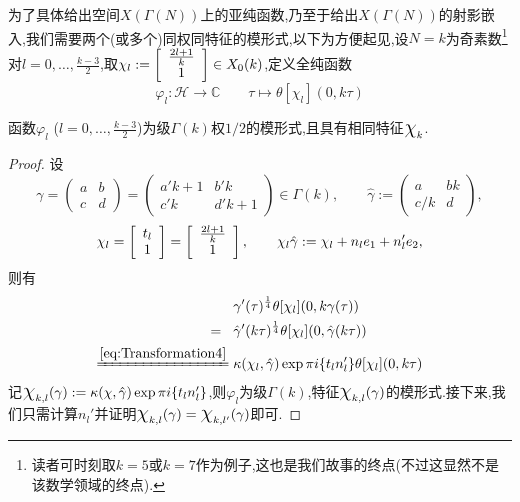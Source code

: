 为了具体给出空间$X(\Gamma(N))$上的亚纯函数,乃至于给出$X(\Gamma(N))$的射影嵌入,我们需要两个(或多个)同权同特征的模形式,以下为方便起见,设$N=k$为奇素数\footnote{读者可时刻取$k=5$或$k=7$作为例子,这也是我们故事的终点(不过这显然不是该数学领域的终点).}对$l=0,\ldots,\frac{k-3}{2}$,取$\chi_l:= \left[\begin{array}{c}{\frac{2l+1}{k}} \\ {1}\end{array}\right] \in X_0(k)$,定义全纯函数
$$\varphi_l: \mathcal{H} \longrightarrow \mathbb{C} \qquad \tau \longmapsto \theta[\chi_l](0,k\tau)$$
\begin{theorem}
	函数$\varphi_l$ ($l=0,\ldots,\frac{k-3}{2}$)为级$\Gamma(k)$权$1/2$的模形式,且具有相同特征$\mbox{\Large$\chi$}_k$.
\end{theorem}
\begin{proof}
	设
	$$\gamma = \begin{pmatrix}
	a & b \\ c & d
	\end{pmatrix}= \begin{pmatrix}
	a'k+1 & b'k \\ c'k & d'k+1
	\end{pmatrix}\in \Gamma(k), \qquad \hat{\gamma}:=\begin{pmatrix}
	a & bk \\ c/k & d
	\end{pmatrix},$$
	$$\chi_l=\left[\begin{array}{c}{t_l} \\ {1}\end{array}\right]=\left[\begin{array}{c}{\frac{2l+1}{k}} \\ {1}\end{array}\right], \qquad \chi_l \hat{\gamma} := \chi_l+n_le_1+n_l'e_2,$$
	则有
	\begin{equation*}
	\begin{aligned}
	&\gamma'(\tau)^{\frac{1}{4}}\theta[\chi_l](0,k\gamma(\tau ))\hspace{3mm}\\
	=\hspace{3mm}& \hat{\gamma}'(k\tau)^{\frac{1}{4}}\theta[\chi_l](0,\hat{\gamma}(k\tau ))\\
	\xeq[]{\eqref{eq:Transformation4}}\;& \kappa(\chi_l, \hat{\gamma})\exp \pi i \{ t_ln_l' \} \theta[\chi_l](0,k\tau)		\\
	\end{aligned}
	\end{equation*}
	记$\mbox{\Large$\chi$}_{k,l}(\gamma):=\kappa(\chi, \hat{\gamma})\exp \pi i \{ t_ln_l' \}$,则$\varphi_l$为级$\Gamma(k)$,特征$\mbox{\Large$\chi$}_{k,l}(\gamma)$的模形式.接下来,我们只需计算$n_l'$并证明$\mbox{\Large$\chi$}_{k,l}(\gamma)=\mbox{\Large$\chi$}_{k,l'}(\gamma)$即可.
	

\end{proof}
